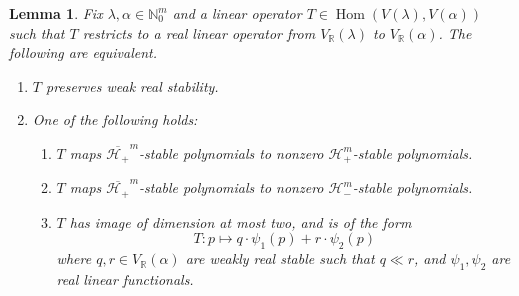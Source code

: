 \documentclass{article}
\newtheorem{lemma}[theorem]{Lemma}
\theoremstyle{definition}
\theoremstyle{plain}
\newcommand{\R}{\mathbb{R}}
\newcommand{\N}{\mathbb{N}}
\newcommand{\UHP}{\mathcal{H}_+}
\newcommand{\LHP}{\mathcal{H}_-}
\DeclareMathOperator{\Hom}{Hom}
\begin{document}
\begin{lemma}\label{bb_Rlink}
    Fix $\lambda,\alpha \in \N_0^m$ and a linear operator $T \in \Hom(V(\lambda),V(\alpha))$ such that $T$ restricts to a real linear operator from $V_\R(\lambda)$ to $V_\R(\alpha)$. The following are equivalent.
    \begin{enumerate}[label=(\roman*)]
        \item $T$ preserves weak real stability.
        \item One of the following holds:
            \begin{enumerate}[label=(\alph*)]
                \item $T$ maps $\overline{\UHP}^m$-stable polynomials to nonzero $\UHP^m$-stable polynomials.
                \item $T$ maps $\overline{\UHP}^m$-stable polynomials to nonzero $\LHP^m$-stable polynomials.
                \item $T$ has image of dimension at most two, and is of the form
                \[
                    T: p \mapsto q \cdot \psi_1(p) + r \cdot \psi_2(p)
                \]
                where $q,r \in V_\R(\alpha)$ are weakly real stable such that $q \ll r$, and $\psi_1,\psi_2$ are real linear functionals.
            \end{enumerate}
    \end{enumerate}
\end{lemma}
\end{document}
